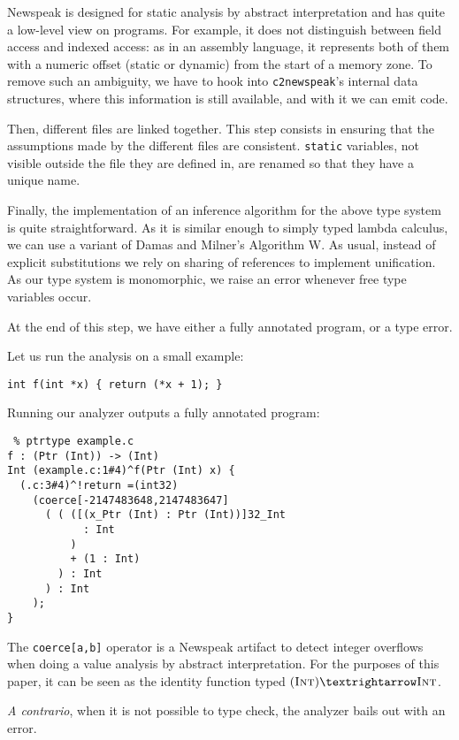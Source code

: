 Newspeak is designed for static analysis by abstract interpretation and has
quite a low-level view on programs. For example, it does not distinguish between
field access and indexed access: as in an assembly language, it represents both
of them with a numeric offset (static or dynamic) from the start of a memory
zone. To remove such an ambiguity, we have to hook into \texttt{c2newspeak}'s
internal data structures, where this information is still available, and with it
we can emit \langname code.

Then, different files are linked together. This step consists in ensuring that
the assumptions made by the different files are consistent. \texttt{static}
variables, not visible outside the file they are defined in, are renamed so that
they have a unique name.

Finally, the implementation of an inference algorithm for the above type system
is quite straightforward. As it is similar enough to simply typed lambda
calculus, we can use a variant of Damas and Milner's Algorithm
W\cite{DamasMilner}. As usual, instead of explicit substitutions we rely on
sharing of references to implement unification. As our type system is
monomorphic, we raise an error whenever free type variables occur.

At the end of this step, we have either a fully annotated program, or a type
error.

Let us run the analysis on a small example:

\begin{verbatim}
int f(int *x) { return (*x + 1); }
\end{verbatim}

Running our analyzer outputs a fully annotated program:

\begin{verbatim}
 % ptrtype example.c
f : (Ptr (Int)) -> (Int)
Int (example.c:1#4)^f(Ptr (Int) x) {
  (.c:3#4)^!return =(int32)
    (coerce[-2147483648,2147483647]
      ( ( ([(x_Ptr (Int) : Ptr (Int))]32_Int
            : Int
          )
          + (1 : Int)
        ) : Int
      ) : Int
    );
}
\end{verbatim}

The \texttt{coerce[a,b]} operator is a Newspeak artifact to detect integer
overflows when doing a value analysis by abstract interpretation. For the
purposes of this paper, it can be seen as the identity function typed
$(\tInt) → \tInt$.

\emph{A contrario}, when it is not possible to type check, the analyzer bails
out with an error.

